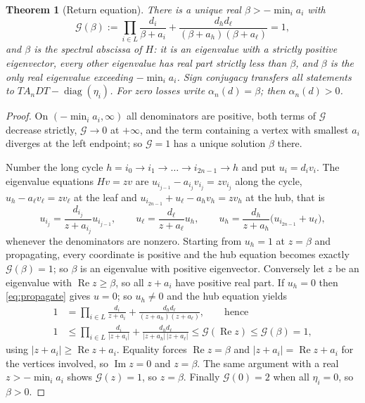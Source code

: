 \documentclass[11pt,a4paper]{article}
\theoremstyle{plain}
\newtheorem{theorem}{Theorem}[section]
\theoremstyle{definition}
\theoremstyle{remark}
\newcommand{\cG}{\mathcal G}
\DeclareMathOperator{\diag}{diag}
\DeclareMathOperator{\Ree}{Re}
\DeclareMathOperator{\Imm}{Im}
\begin{document}
\begin{theorem}[Return equation]\label{thm:return}
There is a unique real $\beta>-\min_ia_i$ with
\begin{equation}\label{eq:return}
\cG(\beta):=\prod_{i\in L}\frac{d_i}{\beta+a_i}+\frac{d_hd_\ell}{(\beta+a_h)(\beta+a_\ell)}=1 ,
\end{equation}
and $\beta$ is the spectral abscissa of $H$: it is an eigenvalue with a strictly positive eigenvector, every other eigenvalue has real part strictly less than $\beta$, and $\beta$ is the only real eigenvalue exceeding $-\min_ia_i$. Sign conjugacy transfers all statements to $TA_nDT-\diag(\eta_i)$. For zero losses write $\alpha_n(d)=\beta$; then $\alpha_n(d)>0$.
\end{theorem}
\begin{proof}
On $(-\min_ia_i,\infty)$ all denominators are positive, both terms of $\cG$ decrease strictly, $\cG\to0$ at $+\infty$, and the term containing a vertex with smallest $a_i$ diverges at the left endpoint; so $\cG=1$ has a unique solution $\beta$ there.

Number the long cycle $h=i_0\to i_1\to\dots\to i_{2n-1}\to h$ and put $u_i=d_iv_i$. The eigenvalue equations $Hv=zv$ are $u_{i_{j-1}}-a_{i_j}v_{i_j}=zv_{i_j}$ along the cycle, $u_h-a_\ell v_\ell=zv_\ell$ at the leaf and $u_{i_{2n-1}}+u_\ell-a_hv_h=zv_h$ at the hub, that is
\begin{equation}\label{eq:propagate}
u_{i_j}=\frac{d_{i_j}}{z+a_{i_j}}u_{i_{j-1}},\qquad u_\ell=\frac{d_\ell}{z+a_\ell}u_h,\qquad u_h=\frac{d_h}{z+a_h}\bigl(u_{i_{2n-1}}+u_\ell\bigr),
\end{equation}
whenever the denominators are nonzero. Starting from $u_h=1$ at $z=\beta$ and propagating, every coordinate is positive and the hub equation becomes exactly $\cG(\beta)=1$; so $\beta$ is an eigenvalue with positive eigenvector. Conversely let $z$ be an eigenvalue with $\Ree z\ge\beta$, so all $z+a_i$ have positive real part. If $u_h=0$ then \eqref{eq:propagate} gives $u=0$; so $u_h\ne0$ and the hub equation yields
\begin{align*}
1&=\prod_{i\in L}\frac{d_i}{z+a_i}+\frac{d_hd_\ell}{(z+a_h)(z+a_\ell)},\qquad\text{hence}\\
1&\le\prod_{i\in L}\frac{d_i}{|z+a_i|}+\frac{d_hd_\ell}{|z+a_h|\,|z+a_\ell|}\le\cG(\Ree z)\le\cG(\beta)=1 ,
\end{align*}
using $|z+a_i|\ge\Ree z+a_i$. Equality forces $\Ree z=\beta$ and $|z+a_i|=\Ree z+a_i$ for the vertices involved, so $\Imm z=0$ and $z=\beta$. The same argument with a real $z>-\min_ia_i$ shows $\cG(z)=1$, so $z=\beta$. Finally $\cG(0)=2$ when all $\eta_i=0$, so $\beta>0$.
\end{proof}
\end{document}
